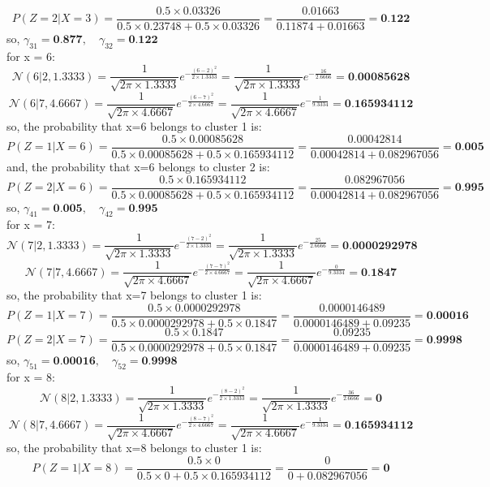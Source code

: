 \documentclass{article}
\begin{document}
\begin{enumerate}
\[
P(Z = 2 | X = 3) = \frac{0.5 \times 0.03326}{0.5 \times 0.23748 + 0.5 \times 0.03326} = \frac{0.01663}{0.11874 + 0.01663} = \textbf{0.122}
\]
so, $\gamma_{31} = \textbf{0.877}, \quad \gamma_{32} = \textbf{0.122}$
\\ for x = 6:
\[
\mathcal{N}(6 | 2, 1.3333) = \frac{1}{\sqrt{2\pi \times 1.3333}} e^{-\frac{(6-2)^2}{2 \times 1.3333}} = \frac{1}{\sqrt{2\pi \times 1.3333}} e^{-\frac{16}{2.6666}} = \textbf{0.00085628}
\]
\[
\mathcal{N}(6 | 7, 4.6667) = \frac{1}{\sqrt{2\pi \times 4.6667}} e^{-\frac{(6-7)^2}{2 \times 4.6667}} = \frac{1}{\sqrt{2\pi \times 4.6667}} e^{-\frac{1}{9.3334}} = \textbf{0.165934112}
\]
so, the probability that x=6 belongs to cluster 1 is:
\[
P(Z = 1 | X = 6) = \frac{0.5 \times 0.00085628}{0.5 \times 0.00085628 + 0.5 \times 0.165934112} = \frac{0.00042814}{0.00042814 + 0.082967056} = \textbf{0.005}
\]
and, the probability that x=6 belongs to cluster 2 is:
\[
P(Z = 2 | X = 6) = \frac{0.5 \times 0.165934112}{0.5 \times 0.00085628 + 0.5 \times 0.165934112} = \frac{0.082967056}{0.00042814 + 0.082967056} = \textbf{0.995}
\]
so, $\gamma_{41} = \textbf{0.005}, \quad \gamma_{42} = \textbf{0.995}$
\\ for x = 7:
\[
\mathcal{N}(7 | 2, 1.3333) = \frac{1}{\sqrt{2\pi \times 1.3333}} e^{-\frac{(7-2)^2}{2 \times 1.3333}} = \frac{1}{\sqrt{2\pi \times 1.3333}} e^{-\frac{25}{2.6666}} = \textbf{0.0000292978}
\]
\[
\mathcal{N}(7 | 7, 4.6667) = \frac{1}{\sqrt{2\pi \times 4.6667}} e^{-\frac{(7-7)^2}{2 \times 4.6667}} = \frac{1}{\sqrt{2\pi \times 4.6667}} e^{-\frac{0}{9.3334}} = \textbf{0.1847}
\]
so, the probability that x=7 belongs to cluster 1 is:
\[
P(Z = 1 | X = 7) = \frac{0.5 \times 0.0000292978}{0.5 \times 0.0000292978 + 0.5 \times 0.1847} = \frac{0.0000146489}{0.0000146489 + 0.09235} = \textbf{0.00016}
\]
\[
P(Z = 2 | X = 7) = \frac{0.5 \times 0.1847}{0.5 \times 0.0000292978 + 0.5 \times 0.1847} = \frac{0.09235}{0.0000146489 + 0.09235} = \textbf{0.9998}
\]
so, $\gamma_{51} = \textbf{0.00016}, \quad \gamma_{52} = \textbf{0.9998}$
\\ for x = 8:
\[
\mathcal{N}(8 | 2, 1.3333) = \frac{1}{\sqrt{2\pi \times 1.3333}} e^{-\frac{(8-2)^2}{2 \times 1.3333}} = \frac{1}{\sqrt{2\pi \times 1.3333}} e^{-\frac{36}{2.6666}} = \textbf{0}
\]
\[
\mathcal{N}(8 | 7, 4.6667) = \frac{1}{\sqrt{2\pi \times 4.6667}} e^{-\frac{(8-7)^2}{2 \times 4.6667}} = \frac{1}{\sqrt{2\pi \times 4.6667}} e^{-\frac{1}{9.3334}} = \textbf{0.165934112}
\]
so, the probability that x=8 belongs to cluster 1 is:
\[
P(Z = 1 | X = 8) = \frac{0.5 \times 0}{0.5 \times 0 + 0.5 \times 0.165934112} = \frac{0}{0 + 0.082967056} = \textbf{0}
\]
\end{enumerate}
\end{document}
